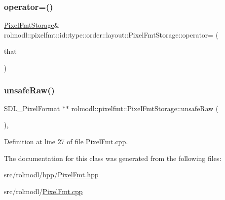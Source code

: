 \mbox{\label{classrolmodl_1_1pixelfmt_1_1id_1_1type_1_1order_1_1layout_1_1_pixel_fmt_storage_adb4ac4c62b99ac4cac9e320e36336cf7}} 
\subsubsection{\texorpdfstring{operator=()}{operator=()}\hspace{0.1cm}{\footnotesize\ttfamily [2/2]}}
{\footnotesize\ttfamily \mbox{\hyperlink{classrolmodl_1_1pixelfmt_1_1id_1_1type_1_1order_1_1layout_1_1_pixel_fmt_storage}{Pixel\+Fmt\+Storage}}\& rolmodl\+::pixelfmt\+::id\+::type\+::order\+::layout\+::\+Pixel\+Fmt\+Storage\+::operator= (\begin{DoxyParamCaption}\item[{\mbox{\hyperlink{classrolmodl_1_1pixelfmt_1_1id_1_1type_1_1order_1_1layout_1_1_pixel_fmt_storage}{Pixel\+Fmt\+Storage}} \&\&}]{that }\end{DoxyParamCaption})\hspace{0.3cm}{\ttfamily [delete]}}

\mbox{\label{classrolmodl_1_1pixelfmt_1_1id_1_1type_1_1order_1_1layout_1_1_pixel_fmt_storage_a5b6727f353410393d330a313bf26ffaf}} 
\subsubsection{\texorpdfstring{unsafeRaw()}{unsafeRaw()}}
{\footnotesize\ttfamily S\+D\+L\+\_\+\+Pixel\+Format $\ast$$\ast$ rolmodl\+::pixelfmt\+::\+Pixel\+Fmt\+Storage\+::unsafe\+Raw (\begin{DoxyParamCaption}{ }\end{DoxyParamCaption})\hspace{0.3cm}{\ttfamily [static]}, {\ttfamily [noexcept]}}



Definition at line 27 of file Pixel\+Fmt.\+cpp.



The documentation for this class was generated from the following files\+:\begin{DoxyCompactItemize}
\item 
src/rolmodl/hpp/\mbox{\hyperlink{_pixel_fmt_8hpp}{Pixel\+Fmt.\+hpp}}\item 
src/rolmodl/\mbox{\hyperlink{_pixel_fmt_8cpp}{Pixel\+Fmt.\+cpp}}\end{DoxyCompactItemize}
